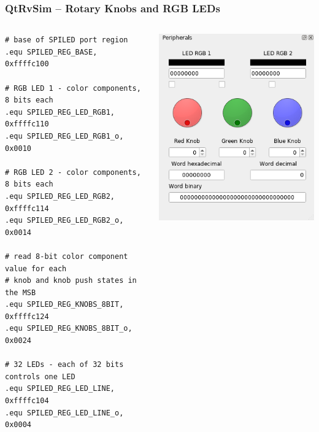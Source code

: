 \documentclass{beamer}
\begin{document}
\begin{frame}[fragile]
\frametitle{QtRvSim -- Rotary Knobs and RGB LEDs}

\begin{columns}
\begin{column}{0.6\textwidth}
\begin{verbatim}
# base of SPILED port region
.equ SPILED_REG_BASE,       0xffffc100

# RGB LED 1 - color components, 8 bits each
.equ SPILED_REG_LED_RGB1,   0xffffc110
.equ SPILED_REG_LED_RGB1_o,   0x0010

# RGB LED 2 - color components, 8 bits each
.equ SPILED_REG_LED_RGB2,   0xffffc114
.equ SPILED_REG_LED_RGB2_o,   0x0014

# read 8-bit color component value for each
# knob and knob push states in the MSB
.equ SPILED_REG_KNOBS_8BIT, 0xffffc124
.equ SPILED_REG_KNOBS_8BIT_o, 0x0024

# 32 LEDs - each of 32 bits controls one LED
.equ SPILED_REG_LED_LINE,   0xffffc104
.equ SPILED_REG_LED_LINE_o,   0x0004
\end{verbatim}
\end{column}
\begin{column}{0.4\textwidth}
\includegraphics[width=\textwidth]{fig/knobs.png}
\end{column}
\end{columns}

\end{frame}
\end{document}
